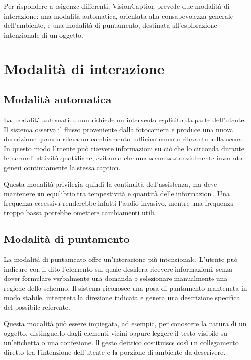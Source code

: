 Per rispondere a esigenze differenti, VisionCaption prevede due modalità di
interazione: una modalità automatica, orientata alla consapevolezza generale
dell'ambiente, e una modalità di puntamento, destinata all'esplorazione
intenzionale di un oggetto.

\section{Modalità di interazione}

\subsection{Modalità automatica}

La modalità automatica non richiede un intervento esplicito da parte
dell'utente. Il sistema osserva il flusso proveniente dalla fotocamera e produce
una nuova descrizione quando rileva un cambiamento sufficientemente rilevante
nella scena. In questo modo l'utente può ricevere informazioni su ciò che lo
circonda durante le normali attività quotidiane, evitando che una scena
sostanzialmente invariata generi continuamente la stessa caption.

Questa modalità privilegia quindi la continuità dell'assistenza, ma deve
mantenere un equilibrio tra tempestività e quantità delle informazioni. Una
frequenza eccessiva renderebbe infatti l'audio invasivo, mentre una frequenza
troppo bassa potrebbe omettere cambiamenti utili.

\subsection{Modalità di puntamento}

La modalità di puntamento offre un'interazione più intenzionale. L'utente può
indicare con il dito l'elemento sul quale desidera ricevere informazioni,
senza dover formulare verbalmente una domanda o selezionare manualmente una
regione dello schermo. Il sistema riconosce una posa di puntamento mantenuta in
modo stabile, interpreta la direzione indicata e genera una descrizione
specifica del possibile referente.

Questa modalità può essere impiegata, ad esempio, per conoscere la natura di
un oggetto, distinguerlo dagli elementi vicini oppure leggere il testo visibile
su un'etichetta o una confezione. Il gesto deittico costituisce così un
collegamento diretto tra l'intenzione dell'utente e la porzione di ambiente da
descrivere.

